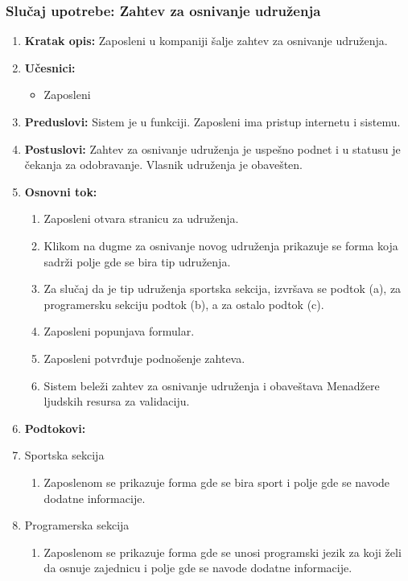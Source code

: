 \documentclass[a4paper]{article}
\begin{document}
\subsubsection{Slučaj upotrebe: Zahtev za osnivanje udruženja}
\begin{enumerate}
    \item \textbf{Kratak opis:} Zaposleni u kompaniji šalje zahtev za osnivanje udruženja.
    \item \textbf{Učesnici:}
        \begin{itemize}
            \item Zaposleni
        \end{itemize}
    \item \textbf{Preduslovi:} Sistem je u funkciji. Zaposleni ima pristup internetu i sistemu.
    \item \textbf{Postuslovi:} Zahtev za osnivanje udruženja je uspešno podnet i u statusu je čekanja za odobravanje. Vlasnik udruženja je obavešten.
    \item \textbf{Osnovni tok:}
        \begin{enumerate}
            \item Zaposleni otvara stranicu za udruženja.
            \item Klikom na dugme za osnivanje novog udruženja prikazuje se forma koja sadrži polje gde se bira tip udruženja.
            \item Za slučaj da je tip udruženja sportska sekcija, izvršava se podtok (a), za programersku sekciju podtok (b), a za ostalo podtok (c).
            \item Zaposleni popunjava formular.
            \item Zaposleni potvrđuje podnošenje zahteva.
            \item Sistem beleži zahtev za osnivanje udruženja i obaveštava Menadžere ljudskih resursa za validaciju.
        \end{enumerate}
    \item \textbf{Podtokovi:}
        \item Sportska sekcija
            \begin{enumerate}
                \item Zaposlenom se prikazuje forma gde se bira sport i polje gde se navode dodatne informacije.
            \end{enumerate}
        \item Programerska sekcija
            \begin{enumerate}
                \item Zaposlenom se prikazuje forma gde se unosi programski jezik za koji želi da osnuje zajednicu i polje gde se navode dodatne informacije.

\end{enumerate}
\end{enumerate}
\end{document}
